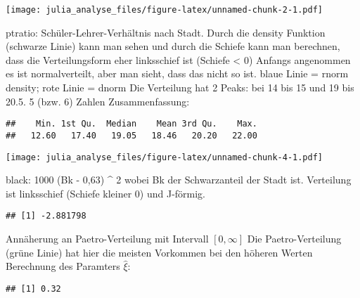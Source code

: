 \documentclass[]{article}
\title{}
\author{}
\date{}
\newenvironment{Shaded}{\begin{snugshade}}{\end{snugshade}}
\newcommand{\KeywordTok}[1]{\textcolor[rgb]{0.13,0.29,0.53}{\textbf{#1}}}
\newcommand{\OperatorTok}[1]{\textcolor[rgb]{0.81,0.36,0.00}{\textbf{#1}}}
\newcommand{\NormalTok}[1]{#1}
\begin{document}
\texttt{[image: julia\_analyse\_files/figure-latex/unnamed-chunk-2-1.pdf]}

ptratio: Schüler-Lehrer-Verhältnis nach Stadt. Durch die density
Funktion (schwarze Linie) kann man sehen und durch die Schiefe kann man
berechnen, dass die Verteilungsform eher linksschief ist (Schiefe
\textless{} 0) Anfangs angenommen es ist normalverteilt, aber man sieht,
dass das nicht so ist. blaue Linie = rnorm density; rote Linie = dnorm
Die Verteilung hat 2 Peaks: bei 14 bis 15 und 19 bis 20.5. 5 (bzw. 6)
Zahlen Zusammenfassung:

\begin{Shaded}
\end{Shaded}

\begin{verbatim}
##    Min. 1st Qu.  Median    Mean 3rd Qu.    Max. 
##   12.60   17.40   19.05   18.46   20.20   22.00
\end{verbatim}

\texttt{[image: julia\_analyse\_files/figure-latex/unnamed-chunk-4-1.pdf]}

black: 1000 (Bk - 0,63) \^{} 2 wobei Bk der Schwarzanteil der Stadt ist.
Verteilung ist linksschief (Schiefe kleiner 0) und J-förmig.

\begin{Shaded}
\end{Shaded}

\begin{verbatim}
## [1] -2.881798
\end{verbatim}

Annäherung an Paetro-Verteilung mit Intervall \([0, \infty]\) Die
Paetro-Verteilung (grüne Linie) hat hier die meisten Vorkommen bei den
höheren Werten Berechnung des Paramters \(\hat \xi\):

\begin{Shaded}
\end{Shaded}

\begin{verbatim}
## [1] 0.32
\end{verbatim}
\end{document}

